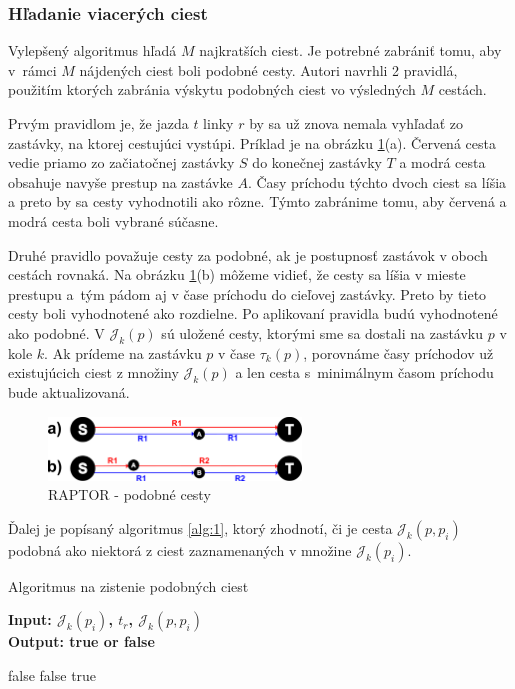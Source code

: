\subsubsection{Hľadanie viacerých ciest}
Vylepšený algoritmus hľadá $M$ najkratších ciest. Je potrebné zabrániť tomu, aby v~rámci $M$ nájdených ciest boli podobné cesty. Autori navrhli 2 pravidlá, použitím ktorých zabránia výskytu podobných ciest vo výsledných $M$ cestách.

Prvým pravidlom je, že jazda $t$ linky $r$ by sa už znova nemala vyhľadať zo zastávky, na ktorej cestujúci vystúpi. Príklad je na obrázku \ref{fig:similar-paths}(a). Červená cesta vedie priamo zo začiatočnej zastávky $S$ do konečnej zastávky $T$ a modrá cesta obsahuje navyše prestup na zastávke $A$. Časy príchodu týchto dvoch ciest sa líšia a preto by sa cesty vyhodnotili ako rôzne. Týmto zabránime tomu, aby červená a modrá cesta boli vybrané súčasne.

Druhé pravidlo považuje cesty za podobné, ak je postupnosť zastávok v oboch cestách rovnaká. Na obrázku \ref{fig:similar-paths}(b) môžeme vidieť, že cesty sa líšia v mieste prestupu a~tým pádom aj v čase príchodu do cieľovej zastávky. Preto by tieto cesty boli vyhodnotené ako rozdielne. Po aplikovaní pravidla budú vyhodnotené ako podobné. 
V $\mathcal{J}_k(p)$ sú uložené cesty, ktorými sme sa dostali na zastávku $p$ v kole $k$. Ak prídeme na zastávku $p$ v čase $\tau_k(p)$, porovnáme časy príchodov už existujúcich ciest z množiny $\mathcal{J}_k(p)$ a len cesta s~minimálnym časom príchodu bude aktualizovaná.

\begin{figure}[H]
\centerline{\includegraphics[width=0.6\textwidth]{images/similar-paths}}
\caption[RAPTOR - podobné cesty]{RAPTOR - podobné cesty}
\label{fig:similar-paths}
\end{figure}

Ďalej je popísaný algoritmus \ref{alg:1}, ktorý zhodnotí, či je cesta $\mathcal{J}_k(p, p_i)$ podobná ako niektorá z ciest zaznamenaných v množine $\mathcal{J}_k(p_i)$.

\begin{algorithm}
\caption{Algoritmus na zistenie podobných ciest}\label{alg:1}
 \hspace*{\algorithmicindent} \textbf{Input: $\mathcal{J}_k(p_i)$, $t_r$, $\mathcal{J}_k(p, p_i)$} \\
 \hspace*{\algorithmicindent} \textbf{Output: true or false} 
\begin{algorithmic}[1]
 \Return false
 \Return false
\Else {} \Return true
\EndIf
\EndFor
\end{algorithmic}
\end{algorithm}

